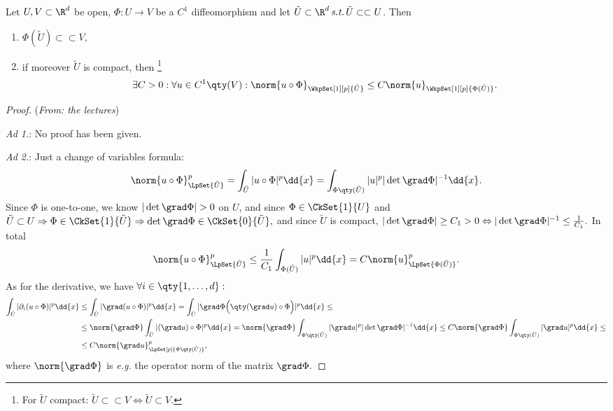 \begin{lemma}
	Let $U,V \subset \R^d$ be open, $\Phi: U \to V$ be a $C^1$ diffeomorphism and let $\tilde{U} \subset \R^{d}\, \text{\textit{s.t.}} \, \tilde{U} \subset \subset U$. Then
	\begin{enumerate}
		\item $\Phi(\tilde{U}) \subset \subset V,$
		\item if moreover $\tilde{U}$ is compact, then \footnote{For $\tilde{U}$ compact: $\tilde{U} \subset \subset V \Leftrightarrow \tilde{U} \subset V$.} 
			\[
				\exists C>0: \forall u \in C^1\qty(V): \norm{u \circ \Phi}_{\WkpSet[1][p]{\tilde{U}}} \leq C \norm{u}_{\WkpSet[1][p]{\Phi(\tilde{U})}}.
			\]
	\end{enumerate}
\end{lemma}

\begin{proof}(\textit{From: the lectures})

	\textit{Ad 1.}: No proof has been given.


	\textit{Ad 2.}: Just a change of variables formula:
	\[
		\norm{u \circ \Phi}_{\LpSet{\tilde{U}}}^p = \int_{\tilde{U}}|u \circ \Phi|^p\dd{x} = \int_{\Phi\qty(\tilde{U})}|u|^p | \det \grad \Phi|^{-1}\dd{x}.
	\]
	Since $\Phi$ is one-to-one, we know $|\det \grad \Phi| >0$ on $U$, and since $\Phi \in \CkSet{1}{U}$ and $\tilde{U} \subset U \Rightarrow \Phi \in \CkSet{1}{\tilde{U}} \Rightarrow \det \grad \Phi \in \CkSet{0}{\tilde{U}},$ and since $\tilde{U}$ is compact, $|\det \grad \Phi| \geq C_1 > 0 \Leftrightarrow |\det \grad \Phi|^{-1}\leq \frac{1}{C_1}.$ In total	
	\[
		\norm{u \circ \Phi}_{\LpSet{\tilde{U}}}^p \leq \frac{1}{C_1} \int_{\Phi(\tilde{U})}|u|^p\dd{x} = C\norm{u}_{\LpSet{\Phi(\tilde{U})}}^p.
	\]
	As for the derivative, we have $\forall i \in \qty{1,\dots,d}:$
	\begin{align*}
		\int_{\tilde{U}}|\partial_{i}(u \circ \Phi)|^p\dd{x} &\leq \int_{\tilde{U}}|\grad (u \circ \Phi)|^p\dd{x} = \int_{\tilde{U}}| \grad \Phi \Big(\qty(\grad u)\circ \Phi\Big)|^p\dd{x}\leq \\
									 &\leq \norm{\grad \Phi} \int_{\tilde{U}}|(\grad u) \circ \Phi|^p\dd{x} = \norm{\grad \Phi} \int_{\Phi\qty(\tilde{U})}|\grad u|^p |\det \grad \Phi|^{-1}\dd{x} \leq C\norm{\grad \Phi} \int_{\Phi\qty(\tilde{U})}|\grad u|^p\dd{x} \leq \\
										 &\leq C \norm{\grad u}_{\LpSet[p]{\Phi\qty(\tilde{U})}}^p,
	\end{align*}
	where $\norm{\grad \Phi}$ is \textit{e.g.} the operator norm of the matrix $\grad \Phi.$
\end{proof}


